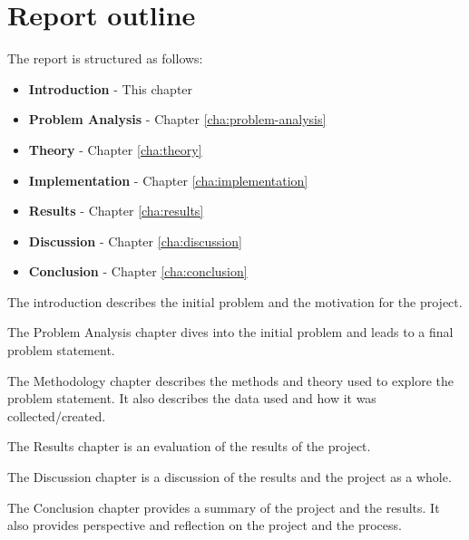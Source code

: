 \section{Report outline}\label{sec:report-outline}
The report is structured as follows:

\begin{itemize}
  \item \textbf{Introduction} - This chapter
  \item \textbf{Problem Analysis} - Chapter \ref{cha:problem-analysis}
  \item \textbf{Theory} - Chapter \ref{cha:theory}
  \item \textbf{Implementation} - Chapter \ref{cha:implementation}
  \item \textbf{Results} - Chapter \ref{cha:results}
  \item \textbf{Discussion} - Chapter \ref{cha:discussion}
  \item \textbf{Conclusion} - Chapter \ref{cha:conclusion}
\end{itemize}

The introduction describes the initial problem and the motivation for the project.

The Problem Analysis chapter dives into the initial problem and leads to a final problem statement.

The Methodology chapter describes the methods and theory used to explore the problem statement. It also describes the data used and how it was collected/created.

The Results chapter is an evaluation of the results of the project.

The Discussion chapter is a discussion of the results and the project as a whole.

The Conclusion chapter provides a summary of the project and the results. It also provides perspective and reflection on the project and the process.